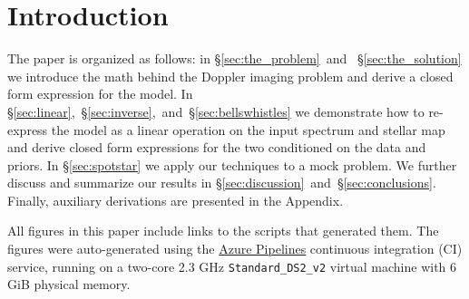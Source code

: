 \documentclass[modern]{aastex62}
\begin{document}
\section{Introduction}
%
%

The paper is organized as follows: in \S\ref{sec:the_problem}~and~%
\S\ref{sec:the_solution} we introduce the math behind the Doppler imaging
problem and derive a closed form expression for the model. In
\S\ref{sec:linear},~\S\ref{sec:inverse},~and~\S\ref{sec:bellswhistles}
we demonstrate how to re-express
the model as a linear operation on the input spectrum and stellar map and
derive closed form expressions for the two conditioned on the data and priors.
In \S\ref{sec:spotstar} we apply our techniques to a mock problem. We
further discuss and summarize our results in
\S\ref{sec:discussion}~and~\S\ref{sec:conclusions}. Finally, auxiliary
derivations are presented in the Appendix.

%

All figures in this paper include links {\color{linkcolor}\faFileCodeO}
to the \Python scripts that generated them. The figures were auto-generated
using the
\href{https://dev.azure.com/rodluger/paparazzi/_build}{Azure Pipelines}
continuous integration (CI) service, running on
a two-core 2.3 GHz \texttt{Standard\_DS2\_v2} virtual machine with 6 GiB physical memory.
\end{document}
